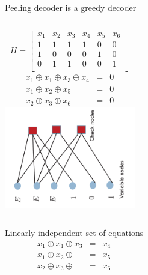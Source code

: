 \documentclass[10pt,xcolor=table]{beamer}
\begin{document}
\begin{frame}{Peeling decoder is a greedy decoder}
\vspace{-3mm}
\begin{columns}
\[
H = \begin{bmatrix}
      x_1 & x_2 & x_3 & x_4 & x_5 & x_6 \\
      1 & 1 & 1 & 1 & 0 & 0 \\
      1 & 0 & 0 & 0 & 1 & 0 \\
      0 & 1 & 1 & 0 & 0 & 1 \\
    \end{bmatrix}
\]
\begin{eqnarray*}
  x_1 \oplus x_1 \oplus x_3 \oplus x_4 &=& 0 \\
  x_1 \oplus x_2 \oplus x_5 &=& 0 \\
  x_2 \oplus x_3 \oplus x_6 &=& 0
\end{eqnarray*}
\includegraphics[width=2.25in,angle=-90]{./Figures/Tannergraph63codestoppingset}
\end{columns}
\pause
\vspace{-3mm}
\begin{columns}
\begin{block}{Linearly independent set of equations}
\begin{eqnarray*}
  x_1 \oplus x_1 \oplus x_3 & = & x_4 \\
  x_1 \oplus x_2 \oplus &=& x_5 \\
  x_2 \oplus x_3 \oplus &=& x_6
\end{eqnarray*}
\end{block}
\end{columns}
\end{frame}
\end{document}
